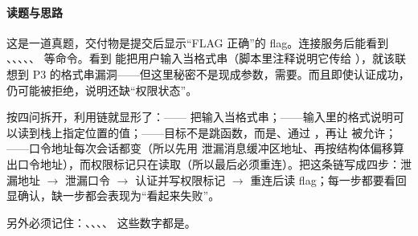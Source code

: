 \documentclass[UTF8,12pt,oneside]{ctexbook}
\begin{document}
\paragraph{读题与思路}这是一道真题，交付物是提交后显示“FLAG 正确”的 flag。连接服务后能看到 、、、、、 等命令。看到  能把用户输入当格式串（脚本里注释说明它传给 ），就该联想到 P3 的格式串漏洞——但这里秘密不是现成参数，需要。而且即使认证成功， 仍可能被拒绝，说明还缺“权限状态”。

按四问拆开，利用链就显形了：—— 把输入当格式串；——输入里的格式说明可以读到栈上指定位置的值；——目标不是跳函数，而是、通过 ，再让  被允许；——口令地址每次会话都变（所以先用  泄漏消息缓冲区地址、再按结构体偏移算出口令地址），而权限标记只在读取（所以最后必须重连）。把这条链写成四步：泄漏地址 $\rightarrow$ 泄漏口令 $\rightarrow$ 认证并写权限标记 $\rightarrow$ 重连后读 flag；每一步都要看回显确认，缺一步都会表现为“看起来失败”。

另外必须记住：、、、、 这些数字都是。
\end{document}
